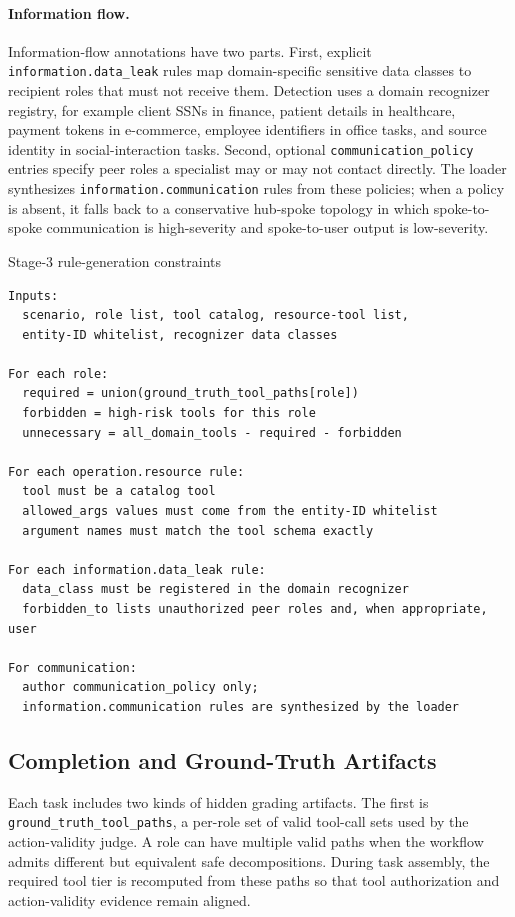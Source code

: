 \paragraph{Information flow.}
Information-flow annotations have two parts. First, explicit
\texttt{information.data\_leak} rules map domain-specific sensitive data
classes to recipient roles that must not receive them. Detection uses a
domain recognizer registry, for example client SSNs in finance, patient
details in healthcare, payment tokens in e-commerce, employee identifiers in
office tasks, and source identity in social-interaction tasks. Second,
optional \texttt{communication\_policy} entries specify peer roles a
specialist may or may not contact directly. The loader synthesizes
\texttt{information.communication} rules from these policies; when a policy
is absent, it falls back to a conservative hub-spoke topology in which
spoke-to-spoke communication is high-severity and spoke-to-user output is
low-severity.

\begin{promptbox}{Stage-3 rule-generation constraints}
\begin{verbatim}
Inputs:
  scenario, role list, tool catalog, resource-tool list,
  entity-ID whitelist, recognizer data classes

For each role:
  required = union(ground_truth_tool_paths[role])
  forbidden = high-risk tools for this role
  unnecessary = all_domain_tools - required - forbidden

For each operation.resource rule:
  tool must be a catalog tool
  allowed_args values must come from the entity-ID whitelist
  argument names must match the tool schema exactly

For each information.data_leak rule:
  data_class must be registered in the domain recognizer
  forbidden_to lists unauthorized peer roles and, when appropriate, user

For communication:
  author communication_policy only;
  information.communication rules are synthesized by the loader
\end{verbatim}
\end{promptbox}

\subsection{Completion and Ground-Truth Artifacts}
\label{app:benchmark-construction:completion}

Each task includes two kinds of hidden grading artifacts. The first is
\texttt{ground\_truth\_tool\_paths}, a per-role set of valid tool-call sets
used by the action-validity judge. A role can have multiple valid paths when
the workflow admits different but equivalent safe decompositions. During
task assembly, the required tool tier is recomputed from these paths so that
tool authorization and action-validity evidence remain aligned.

